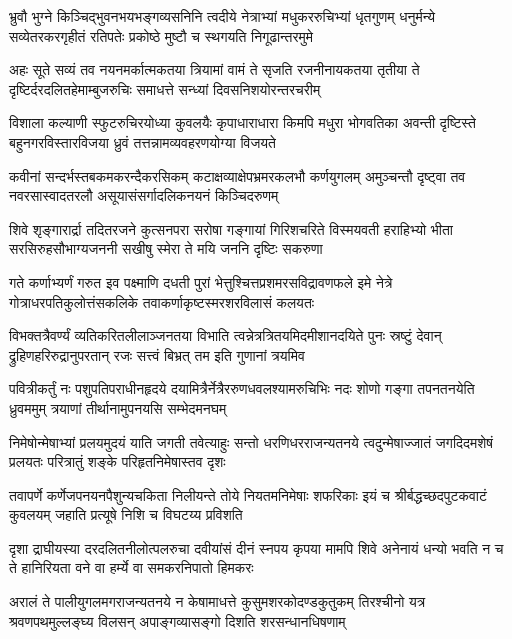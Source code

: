 \fourlineindentedshloka
{भ्रुवौ भुग्ने  किञ्चिद्भुवनभयभङ्गव्यसनिनि}
{त्वदीये नेत्राभ्यां मधुकररुचिभ्यां धृतगुणम्}
{धनुर्मन्ये सव्येतरकरगृहीतं रतिपतेः}
{प्रकोष्ठे मुष्टौ च स्थगयति निगूढान्तरमुमे}%

\fourlineindentedshloka
{अहः सूते सव्यं तव नयनमर्कात्मकतया}
{त्रियामां वामं ते सृजति रजनीनायकतया}
{तृतीया ते दृष्टिर्दरदलितहेमाम्बुजरुचिः}
{समाधत्ते सन्ध्यां दिवसनिशयोरन्तरचरीम्}%

\fourlineindentedshloka
{विशाला कल्याणी स्फुटरुचिरयोध्या कुवलयैः}
{कृपाधाराधारा किमपि मधुरा भोगवतिका}
{अवन्ती दृष्टिस्ते बहुनगरविस्तारविजया}
{ध्रुवं तत्तन्नामव्यवहरणयोग्या विजयते}%

\fourlineindentedshloka
{कवीनां सन्दर्भस्तबकमकरन्दैकरसिकम्}
{कटाक्षव्याक्षेपभ्रमरकलभौ कर्णयुगलम्}
{अमुञ्चन्तौ दृष्ट्वा तव नवरसास्वादतरलौ}
{असूयासंसर्गादलिकनयनं किञ्चिदरुणम्}%

\fourlineindentedshloka
{शिवे शृङ्गारार्द्रा तदितरजने कुत्सनपरा}
{सरोषा गङ्गायां गिरिशचरिते विस्मयवती}
{हराहिभ्यो भीता सरसिरुहसौभाग्यजननी}
{सखीषु स्मेरा ते मयि जननि दृष्टिः सकरुणा}%

\fourlineindentedshloka
{गते कर्णाभ्यर्णं गरुत इव पक्ष्माणि दधती}
{पुरां भेत्तुश्चित्तप्रशमरसविद्रावणफले}
{इमे नेत्रे गोत्राधरपतिकुलोत्तंसकलिके}
{तवाकर्णाकृष्टस्मरशरविलासं कलयतः}%

\fourlineindentedshloka
{विभक्तत्रैवर्ण्यं व्यतिकरितलीलाञ्जनतया}
{विभाति त्वन्नेत्रत्रितयमिदमीशानदयिते}
{पुनः स्रष्टुं देवान् द्रुहिणहरिरुद्रानुपरतान्}
{रजः सत्त्वं बिभ्रत् तम इति गुणानां त्रयमिव}%

\fourlineindentedshloka
{पवित्रीकर्तुं नः पशुपतिपराधीनहृदये}
{दयामित्रैर्नेत्रैररुणधवलश्यामरुचिभिः}
{नदः शोणो गङ्गा तपनतनयेति ध्रुवममुम्}
{त्रयाणां तीर्थानामुपनयसि सम्भेदमनघम्}%

\fourlineindentedshloka
{निमेषोन्मेषाभ्यां प्रलयमुदयं याति जगती}
{तवेत्याहुः सन्तो धरणिधरराजन्यतनये}
{त्वदुन्मेषाज्जातं जगदिदमशेषं प्रलयतः}
{परित्रातुं शङ्के परिहृतनिमेषास्तव दृशः}%

\fourlineindentedshloka
{तवापर्णे कर्णेजपनयनपैशुन्यचकिता}
{निलीयन्ते तोये नियतमनिमेषाः शफरिकाः}
{इयं च श्रीर्बद्धच्छदपुटकवाटं कुवलयम्}
{जहाति प्रत्यूषे निशि च विघटय्य प्रविशति}%

\fourlineindentedshloka
{दृशा द्राघीयस्या दरदलितनीलोत्पलरुचा}
{दवीयांसं दीनं स्नपय कृपया मामपि शिवे}
{अनेनायं धन्यो भवति न च ते हानिरियता}
{वने वा हर्म्ये वा समकरनिपातो हिमकरः}%

\fourlineindentedshloka
{अरालं ते पालीयुगलमगराजन्यतनये}
{न केषामाधत्ते कुसुमशरकोदण्डकुतुकम्}
{तिरश्चीनो यत्र श्रवणपथमुल्लङ्घ्य विलसन्}
{अपाङ्गव्यासङ्गो दिशति शरसन्धानधिषणाम्}%

